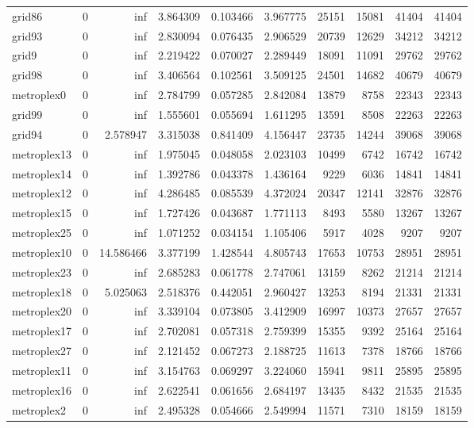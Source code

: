 \begin{longtable}{|l|r|r|r|r|r|r|r|r|r|}
grid86 & 0 & inf & 3.864309 & 0.103466 & 3.967775 & 25151 & 15081 & 41404 & 41404 \\
grid93 & 0 & inf & 2.830094 & 0.076435 & 2.906529 & 20739 & 12629 & 34212 & 34212 \\
grid9 & 0 & inf & 2.219422 & 0.070027 & 2.289449 & 18091 & 11091 & 29762 & 29762 \\
grid98 & 0 & inf & 3.406564 & 0.102561 & 3.509125 & 24501 & 14682 & 40679 & 40679 \\
metroplex0 & 0 & inf & 2.784799 & 0.057285 & 2.842084 & 13879 & 8758 & 22343 & 22343 \\
grid99 & 0 & inf & 1.555601 & 0.055694 & 1.611295 & 13591 & 8508 & 22263 & 22263 \\
grid94 & 0 & 2.578947 & 3.315038 & 0.841409 & 4.156447 & 23735 & 14244 & 39068 & 39068 \\
metroplex13 & 0 & inf & 1.975045 & 0.048058 & 2.023103 & 10499 & 6742 & 16742 & 16742 \\
metroplex14 & 0 & inf & 1.392786 & 0.043378 & 1.436164 & 9229 & 6036 & 14841 & 14841 \\
metroplex12 & 0 & inf & 4.286485 & 0.085539 & 4.372024 & 20347 & 12141 & 32876 & 32876 \\
metroplex15 & 0 & inf & 1.727426 & 0.043687 & 1.771113 & 8493 & 5580 & 13267 & 13267 \\
metroplex25 & 0 & inf & 1.071252 & 0.034154 & 1.105406 & 5917 & 4028 & 9207 & 9207 \\
metroplex10 & 0 & 14.586466 & 3.377199 & 1.428544 & 4.805743 & 17653 & 10753 & 28951 & 28951 \\
metroplex23 & 0 & inf & 2.685283 & 0.061778 & 2.747061 & 13159 & 8262 & 21214 & 21214 \\
metroplex18 & 0 & 5.025063 & 2.518376 & 0.442051 & 2.960427 & 13253 & 8194 & 21331 & 21331 \\
metroplex20 & 0 & inf & 3.339104 & 0.073805 & 3.412909 & 16997 & 10373 & 27657 & 27657 \\
metroplex17 & 0 & inf & 2.702081 & 0.057318 & 2.759399 & 15355 & 9392 & 25164 & 25164 \\
metroplex27 & 0 & inf & 2.121452 & 0.067273 & 2.188725 & 11613 & 7378 & 18766 & 18766 \\
metroplex11 & 0 & inf & 3.154763 & 0.069297 & 3.224060 & 15941 & 9811 & 25895 & 25895 \\
metroplex16 & 0 & inf & 2.622541 & 0.061656 & 2.684197 & 13435 & 8432 & 21535 & 21535 \\
metroplex2 & 0 & inf & 2.495328 & 0.054666 & 2.549994 & 11571 & 7310 & 18159 & 18159 \\

\end{longtable}
